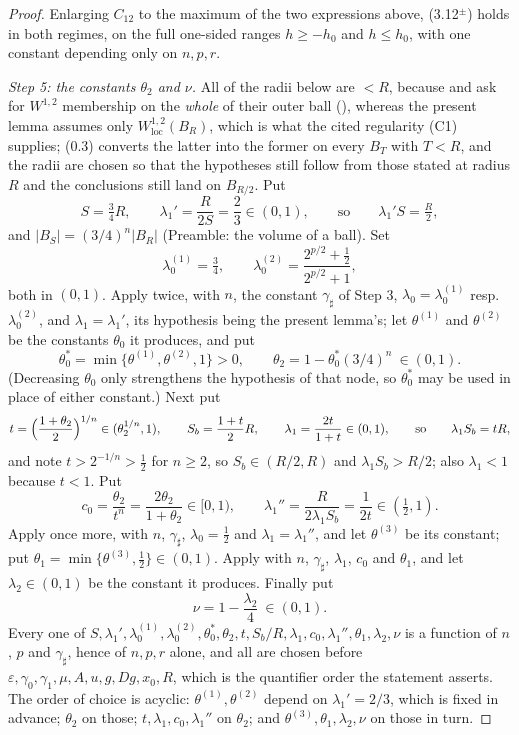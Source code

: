 \begin{proof}
Enlarging $C_{12}$ to the maximum of the two expressions above, (3.12$^\pm$)
holds in both regimes, on the full one-sided ranges $h\ge-h_0$ and $h\le h_0$,
with one constant depending only on $n,p,r$.

\emph{Step 5: the constants $\theta_2$ and $\nu$.}  All of the radii below are
$<R$, because  and
 ask for $W^{1,2}$ membership on the
\emph{whole} of their outer ball (), whereas the present
lemma assumes only $W^{1,2}_{\mathrm{loc}}(B_R)$, which is what the cited
regularity (C1) supplies; (0.3) converts the latter into the former on every
$B_T$ with $T<R$, and the radii are chosen so that the hypotheses still follow
from those stated at radius $R$ and the conclusions still land on $B_{R/2}$.
Put
\[
S=\tfrac34R,\qquad \lambda_1'=\frac R{2S}=\frac23\in(0,1),
\qquad\text{so}\qquad \lambda_1'S=\tfrac R2 ,
\]
and $|B_S|=(3/4)^n|B_R|$ (Preamble: the volume of a ball).  Set
\[
\lambda_0^{(1)}=\tfrac34,\qquad
\lambda_0^{(2)}=\frac{2^{p/2}+\tfrac12}{2^{p/2}+1},
\]
both in $(0,1)$.  Apply  twice, with
$n$, the constant $\gamma_\sharp$ of Step 3, $\lambda_0=\lambda_0^{(1)}$ resp.\
$\lambda_0^{(2)}$, and $\lambda_1=\lambda_1'$, its hypothesis
 being the present lemma's; let $\theta^{(1)}$
and $\theta^{(2)}$ be the constants $\theta_0$ it produces, and put
\[
\theta_0^\ast=\min\{\theta^{(1)},\theta^{(2)},1\}>0,
\qquad
\theta_2=1-\theta_0^\ast(3/4)^n\ \in(0,1) .
\]
(Decreasing $\theta_0$ only strengthens the hypothesis of that node, so
$\theta_0^\ast$ may be used in place of either constant.)  Next put
\[
t=\Bigl(\frac{1+\theta_2}2\Bigr)^{1/n}\in(\theta_2^{1/n},1),
\qquad
S_b=\frac{1+t}2R,\qquad
\lambda_1=\frac{2t}{1+t}\in(0,1),
\qquad\text{so}\qquad \lambda_1S_b=tR,
\]
and note $t>2^{-1/n}>\tfrac12$ for $n\ge2$, so $S_b\in(R/2,R)$ and
$\lambda_1S_b>R/2$; also $\lambda_1<1$ because $t<1$.  Put
\[
c_0=\frac{\theta_2}{t^n}=\frac{2\theta_2}{1+\theta_2}\in[0,1),
\qquad
\lambda_1''=\frac R{2\lambda_1S_b}=\frac1{2t}\in(\tfrac12,1) .
\]
Apply  once more, with $n$,
$\gamma_\sharp$, $\lambda_0=\tfrac12$ and $\lambda_1=\lambda_1''$, and let
$\theta^{(3)}$ be its constant; put $\theta_1=\min\{\theta^{(3)},\tfrac12\}\in(0,1)$.
Apply \noderef{LevelSetMeasureImprovement} with $n$, $\gamma_\sharp$,
$\lambda_1$, $c_0$ and $\theta_1$, and let $\lambda_2\in(0,1)$ be the constant
it produces.  Finally put
\[
\nu=1-\frac{\lambda_2}4\ \in(0,1).
\]
Every one of $S,\lambda_1',\lambda_0^{(1)},\lambda_0^{(2)},\theta_0^\ast,
\theta_2,t,S_b/R,\lambda_1,c_0,\lambda_1'',\theta_1,\lambda_2,\nu$ is a function
of $n$, $p$ and $\gamma_\sharp$, hence of $n,p,r$ alone, and all are chosen
before $\varepsilon,\gamma_0,\gamma_1,\mu,A,u,g,Dg,x_0,R$, which is the
quantifier order the statement asserts.  The order of choice is acyclic:
$\theta^{(1)},\theta^{(2)}$ depend on $\lambda_1'=2/3$, which is fixed in
advance; $\theta_2$ on those; $t,\lambda_1,c_0,\lambda_1''$ on $\theta_2$; and
$\theta^{(3)},\theta_1,\lambda_2,\nu$ on those in turn.


\end{proof}
